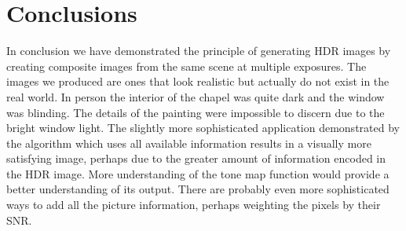 \documentclass[a4paper]{article}
\begin{document}
\section{Conclusions}
In conclusion we have demonstrated the principle of generating HDR images by creating composite images from the same scene at multiple exposures.  The images we produced are ones that look realistic but actually do not exist in the real world.  In person the interior of the chapel was quite dark and the window was blinding.  The details of the painting were impossible to discern due to the bright window light. The slightly more sophisticated application demonstrated by the algorithm which uses all available information results in a visually more satisfying image, perhaps due to the greater amount of information encoded in the HDR image. More understanding of the tone map function would provide a better understanding of its output.  There are probably even more sophisticated ways to add all the picture information, perhaps weighting the pixels by their SNR.  

\end{document}
